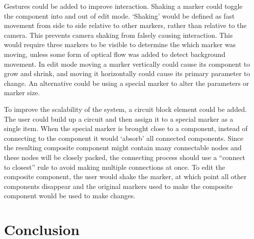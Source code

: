 Gestures could be added to improve interaction. Shaking a marker could toggle the component into and out of edit mode. `Shaking' would be defined as fast movement from side to side relative to other markers, rather than relative to the camera. This prevents camera shaking from falsely causing interaction. This would require three markers to be visible to determine the which marker was moving, unless some form of optical flow was added to detect background movement. In edit mode moving a marker vertically could cause its component to grow and shrink, and moving it horizontally could cause its primary parameter to change. An alternative could be using a special marker to alter the parameters or marker size.

To improve the scalability of the system, a circuit block element could be added. The user could build up a circuit and then assign it to a special marker as a single item. When the special marker is brought close to a component, instead of connecting to the component it would `absorb' all connected components. Since the resulting composite component might contain many connectable nodes and these nodes will be closely packed, the connecting process should use a ``connect to closest'' rule to avoid making multiple connections at once. To edit the composite component, the user would shake the marker, at which point all other components disappear and the original markers used to make the composite component would be used to make changes.


\section{Conclusion}

